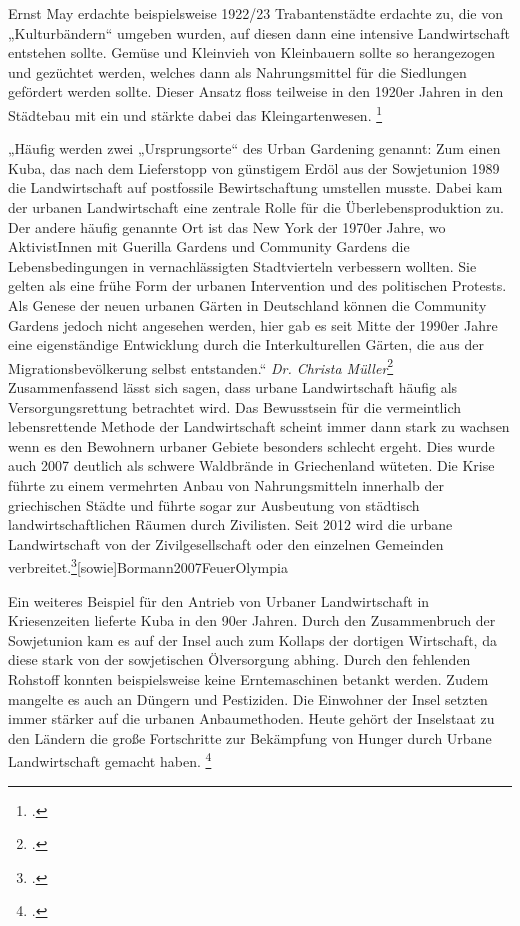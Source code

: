 \documentclass{scrartcl}
\begin{document}
Ernst May erdachte beispielsweise 1922/23 Trabantenstädte erdachte zu, die von „Kulturbändern“ umgeben wurden, auf diesen dann eine intensive Landwirtschaft entstehen sollte. Gemüse und Kleinvieh von Kleinbauern sollte so herangezogen und gezüchtet werden, welches dann als Nahrungsmittel für die Siedlungen gefördert werden sollte. Dieser Ansatz floss teilweise in den 1920er Jahren in den Städtebau mit ein und stärkte dabei das Kleingartenwesen. \footcite[Vgl.][S. 145]{MullerUrbanStadt}

„Häufig werden zwei „Ursprungsorte“ des Urban Gardening genannt: Zum einen Kuba, das nach dem Lieferstopp von günstigem Erdöl aus der Sowjetunion 1989 die Landwirtschaft auf postfossile Bewirtschaftung umstellen musste. Dabei kam der urbanen Landwirtschaft eine zentrale Rolle für die Überlebensproduktion zu. Der andere häufig genannte Ort ist das New York der 1970er Jahre, wo AktivistInnen mit Guerilla Gardens und Community Gardens die Lebensbedingungen in vernachlässigten Stadtvierteln verbessern wollten. Sie gelten als eine frühe Form der urbanen Intervention und des politischen Protests. Als Genese der neuen urbanen Gärten in Deutschland können die Community Gardens jedoch nicht angesehen werden, hier gab es seit Mitte der 1990er Jahre eine eigenständige Entwicklung durch die Interkulturellen Gärten, die aus der Migrationsbevölkerung selbst entstanden.“ \textit{Dr. Christa Müller}\footcite{}
\\
Zusammenfassend lässt sich sagen, dass urbane Landwirtschaft häufig als Versorgungsrettung betrachtet wird. Das Bewusstsein für die vermeintlich lebensrettende Methode der Landwirtschaft scheint immer dann stark zu wachsen wenn es den Bewohnern urbaner Gebiete besonders schlecht ergeht. Dies wurde auch 2007 deutlich als schwere Waldbrände in Griechenland wüteten. Die Krise führte zu einem vermehrten Anbau von Nahrungsmitteln innerhalb der griechischen Städte und führte sogar zur Ausbeutung von städtisch landwirtschaftlichen Räumen durch Zivilisten. Seit 2012 wird die urbane Landwirtschaft von der Zivilgesellschaft oder den einzelnen Gemeinden verbreitet.\footcite[Vgl.]{Kolokouris2015URBANPROTEST}[sowie]{Bormann2007FeuerOlympia}

Ein weiteres Beispiel für den Antrieb von Urbaner Landwirtschaft in Kriesenzeiten lieferte Kuba in den 90er Jahren. Durch den Zusammenbruch der Sowjetunion kam es auf der Insel auch zum Kollaps der dortigen Wirtschaft, da diese stark von der sowjetischen Ölversorgung abhing. Durch den fehlenden Rohstoff konnten beispielsweise keine Erntemaschinen betankt werden. Zudem mangelte es auch an Düngern und Pestiziden. Die Einwohner der Insel setzten immer stärker auf die urbanen Anbaumethoden. Heute gehört der Inselstaat zu den Ländern die große Fortschritte zur Bekämpfung von Hunger durch Urbane Landwirtschaft gemacht haben. \footcite[Vgl.]{Sieg2016DieKuba}
\end{document}
